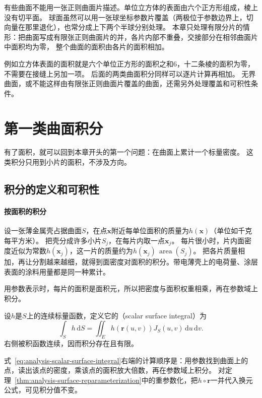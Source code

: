 有些曲面不能用一张正则曲面片描述。单位立方体的表面由六个正方形组成，棱上没有切平面。
球面虽然可以用一张球坐标参数片覆盖（两极位于参数边界上，切向量在那里退化），也常分成上下两个半球分别处理。
本章只处理有限分片的情形：把曲面写成有限张正则曲面片的并，各片内部不重叠，交接部分在相邻曲面片中面积均为零，
整个曲面的面积由各片的面积相加。

例如立方体表面的面积就是六个单位正方形的面积之和$6$，十二条棱的面积为零，不需要在接缝上另加一项。
后面的两类曲面积分同样可以逐片计算再相加。
无界曲面，或不能这样由有限张正则曲面片覆盖的曲面，还需另外处理覆盖和可积性条件。

\section{第一类曲面积分}

有了面积，就可以回到本章开头的第一个问题：在曲面上累计一个标量密度。
这类积分只用到小片的面积，不涉及方向。

\subsection{积分的定义和可积性}

\paragraph{按面积的积分}

设一张薄金属壳占据曲面$S$，在点$\bm x$附近每单位面积的质量为$h(\bm x)$（单位如千克每平方米）。
把壳分成许多小片$S_j$，在每片内取一点$\bm x_j$。
每片很小时，片内面密度近似为常数$h(\bm x_j)$，这一片的质量约为$h(\bm x_j)\,\operatorname{area}(S_j)$。
把各片质量相加，再让分割越来越细，就得到面密度对面积的积分。带电薄壳上的电荷量、涂层表面的涂料用量都是同一种累计。

用参数表示时，每片的面积是面积元，所以把密度与面积权重相乘，再在参数域上积分。

\begin{definition}[第一类曲面积分]
\label{def:analysis-scalar-surface-integral}
设$h$是$S$上的连续标量函数，定义它的（scalar surface integral）为
\begin{equation}
 \int_Sh\,\mathrm dS
 =\iint_Eh(\bm r(u,v))J_S(u,v)\,\mathrm du\,\mathrm dv.
 \label{eq:analysis-scalar-surface-integral}
\end{equation}
右侧被积函数连续，因而积分存在且有限。
\end{definition}

式~\eqref{eq:analysis-scalar-surface-integral}右端的计算顺序是：用参数找到曲面上的点，读出该点的密度，乘该点的面积放大倍数，再在参数域上积分。
对定理~\ref{thm:analysis-surface-reparameterization}中的重参数化，把$h\circ\bm r$一并代入换元公式，可见积分值不变。

